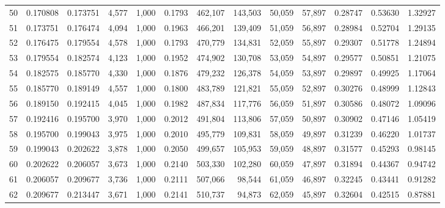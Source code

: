 \begin{tabular}{rrrrrrrrrrrrr}
50  &  0.170808 &  0.173751 &   4,577 &  1,000 &                                     0.1793 &  462,107 &  143,503 &   50,059 &   57,897 &  0.28747 &  0.53630 &  1.32927 \\
51  &  0.173751 &  0.176474 &   4,094 &  1,000 &                                     0.1963 &  466,201 &  139,409 &   51,059 &   56,897 &  0.28984 &  0.52704 &  1.29135 \\
52  &  0.176475 &  0.179554 &   4,578 &  1,000 &                                     0.1793 &  470,779 &  134,831 &   52,059 &   55,897 &  0.29307 &  0.51778 &  1.24894 \\
53  &  0.179554 &  0.182574 &   4,123 &  1,000 &                                     0.1952 &  474,902 &  130,708 &   53,059 &   54,897 &  0.29577 &  0.50851 &  1.21075 \\
54  &  0.182575 &  0.185770 &   4,330 &  1,000 &                                     0.1876 &  479,232 &  126,378 &   54,059 &   53,897 &  0.29897 &  0.49925 &  1.17064 \\
55  &  0.185770 &  0.189149 &   4,557 &  1,000 &                                     0.1800 &  483,789 &  121,821 &   55,059 &   52,897 &  0.30276 &  0.48999 &  1.12843 \\
56  &  0.189150 &  0.192415 &   4,045 &  1,000 &                                     0.1982 &  487,834 &  117,776 &   56,059 &   51,897 &  0.30586 &  0.48072 &  1.09096 \\
57  &  0.192416 &  0.195700 &   3,970 &  1,000 &                                     0.2012 &  491,804 &  113,806 &   57,059 &   50,897 &  0.30902 &  0.47146 &  1.05419 \\
58  &  0.195700 &  0.199043 &   3,975 &  1,000 &                                     0.2010 &  495,779 &  109,831 &   58,059 &   49,897 &  0.31239 &  0.46220 &  1.01737 \\
59  &  0.199043 &  0.202622 &   3,878 &  1,000 &                                     0.2050 &  499,657 &  105,953 &   59,059 &   48,897 &  0.31577 &  0.45293 &  0.98145 \\
60  &  0.202622 &  0.206057 &   3,673 &  1,000 &                                     0.2140 &  503,330 &  102,280 &   60,059 &   47,897 &  0.31894 &  0.44367 &  0.94742 \\
61  &  0.206057 &  0.209677 &   3,736 &  1,000 &                                     0.2111 &  507,066 &   98,544 &   61,059 &   46,897 &  0.32245 &  0.43441 &  0.91282 \\
62  &  0.209677 &  0.213447 &   3,671 &  1,000 &                                     0.2141 &  510,737 &   94,873 &   62,059 &   45,897 &  0.32604 &  0.42515 &  0.87881 \\

\end{tabular}
